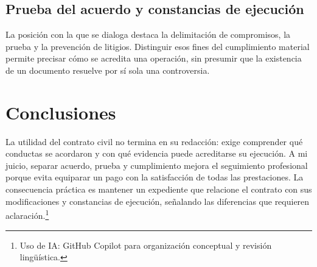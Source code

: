 {\clearpage
\subsection{Prueba del acuerdo y constancias de ejecución}
La posición con la que se dialoga destaca la delimitación de compromisos, la prueba y la prevención de litigios. Distinguir esos fines del cumplimiento material permite precisar cómo se acredita una operación, sin presumir que la existencia de un documento resuelve por sí sola una controversia.
\begin{tcolorbox}[enhanced,breakable,colback=white,colframe=uasBlue,arc=2pt,boxrule=0.5pt]
\end{tcolorbox}

\clearpage
\section{Conclusiones}
La utilidad del contrato civil no termina en su redacción: exige comprender qué conductas se acordaron y con qué evidencia puede acreditarse su ejecución. A mi juicio, separar acuerdo, prueba y cumplimiento mejora el seguimiento profesional porque evita equiparar un pago con la satisfacción de todas las prestaciones. La consecuencia práctica es mantener un expediente que relacione el contrato con sus modificaciones y constancias de ejecución, señalando las diferencias que requieren aclaración.\footnote{Uso de IA: GitHub Copilot para organización conceptual y revisión lingüística.}
\clearpage
}
